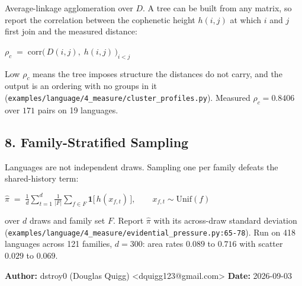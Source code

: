 Average-linkage agglomeration over \(D\). A tree can be built from any matrix, so report the correlation between the cophenetic height \(h(i,j)\) at which \(i\) and \(j\) first join and the measured distance:

\(\rho_c \;=\; \mathrm{corr}\bigl(\,D(i,j),\; h(i,j)\,\bigr)_{i < j}\)

Low \(\rho_c\) means the tree imposes structure the distances do not carry, and the output is an ordering with no groups in it (\texttt{examples/\allowbreak{}language/\allowbreak{}4\_\allowbreak{}measure/\allowbreak{}cluster\_\allowbreak{}profiles.\allowbreak{}py}). Measured \(\rho_c = 0.8406\) over \(171\) pairs on 19 languages.

\subsection{8. Family-Stratified Sampling}

Languages are not independent draws. Sampling one per family defeats the shared-history term:

\(\hat{\pi} \;=\; \frac{1}{d}\sum_{t=1}^{d} \frac{1}{|F|}\sum_{f \in F} \mathbf{1}\bigl[\,h(x_{f,t})\,\bigr], \qquad x_{f,t} \sim \mathrm{Unif}(f)\)

over \(d\) draws and family set \(F\). Report \(\hat{\pi}\) with its across-draw standard deviation (\texttt{examples/\allowbreak{}language/\allowbreak{}4\_\allowbreak{}measure/\allowbreak{}evidential\_\allowbreak{}pressure.\allowbreak{}py:65-\allowbreak{}78}). Run on 418 languages across 121 families, \(d=300\): area rates \(0.089\) to \(0.716\) with scatter \(0.029\) to \(0.069\).

\textbf{Author:} dstroy0 (Douglas Quigg) <dquigg123@gmail.com> \textbf{Date:} 2026-09-03

